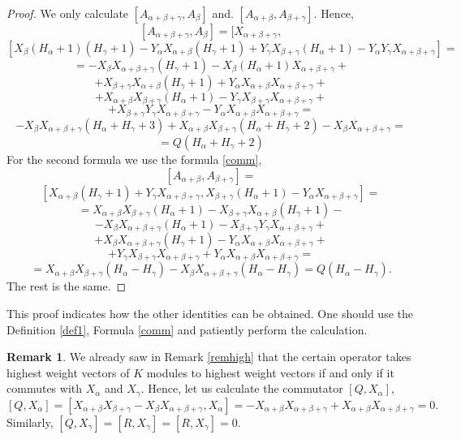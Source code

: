 \documentclass[twoside,a4paper,12pt]{article}
\theoremstyle{definition}
\newtheorem{remark}{Remark}
\begin{document}
\begin{proof}
	We only calculate $[A_{\alpha+\beta+\gamma},A_\beta]$ and.
	$[A_{\alpha+\beta},A_{\beta+\gamma}]$. Hence,
	\[ [A_{\alpha+\beta+\gamma},A_\beta]=[X_{\alpha+\beta+\gamma}, \]
	\[ [X_{\beta}(H_\alpha+1)(H_\gamma+1)-Y_\alpha X_{\alpha+\beta}(H_\gamma+1)
		+Y_\gamma X_{\beta+\gamma}(H_\alpha+1)
		-Y_\alpha Y_\gamma X_{\alpha+\beta+\gamma}]= \]
	\[ =-X_{\beta}X_{\alpha+\beta+\gamma}(H_\gamma+1)
		-X_{\beta}(H_\alpha+1)X_{\alpha+\beta+\gamma}+ \]
	\[ +X_{\beta+\gamma}X_{\alpha+\beta}(H_\gamma+1)
		+Y_\alpha X_{\alpha+\beta}X_{\alpha+\beta+\gamma}+ \]
	\[ +X_{\alpha+\beta}X_{\beta+\gamma}(H_\alpha+1)
		-Y_\gamma X_{\beta+\gamma}X_{\alpha+\beta+\gamma}+ \]
	\[ +X_{\beta+\gamma}Y_\gamma X_{\alpha+\beta+\gamma}
		-Y_\alpha X_{\alpha+\beta}X_{\alpha+\beta+\gamma}= \]
	\[ -X_{\beta}X_{\alpha+\beta+\gamma}(H_\alpha+H_\gamma+3)
		+X_{\alpha+\beta}X_{\beta+\gamma}(H_\alpha+H_\gamma+2)
		-X_{\beta}X_{\alpha+\beta+\gamma}= \]
	\[ =Q(H_\alpha+H_\gamma+2) \]
	For the second formula we use the formula \eqref{comm},
	\[ [A_{\alpha+\beta},A_{\beta+\gamma}]= \]
	\[ [X_{\alpha+\beta}(H_\gamma+1)+Y_\gamma X_{\alpha+\beta+\gamma},
		X_{\beta+\gamma}(H_\alpha+1)-Y_\alpha X_{\alpha+\beta+\gamma}]= \]
	\[ =X_{\alpha+\beta}X_{\beta+\gamma}(H_\alpha+1)
		-X_{\beta+\gamma}X_{\alpha+\beta}(H_\gamma+1)- \]
	\[ -X_\beta X_{\alpha+\beta+\gamma}(H_\alpha+1)
		-X_{\beta+\gamma}Y_\gamma X_{\alpha+\beta+\gamma}+ \]
	\[ +X_\beta X_{\alpha+\beta+\gamma}(H_\gamma+1)
		-Y_\alpha X_{\alpha+\beta}X_{\alpha+\beta+\gamma}+ \]
	\[ +Y_\gamma X_{\beta+\gamma}X_{\alpha+\beta+\gamma}
		+Y_\alpha X_{\alpha+\beta}X_{\alpha+\beta+\gamma}= \]
	\[ =X_{\alpha+\beta}X_{\beta+\gamma}(H_\alpha-H_\gamma)
		-X_{\beta}X_{\alpha+\beta+\gamma}(H_\alpha-H_\gamma)=
		Q(H_\alpha-H_\gamma). \]
	The rest is the same.
\end{proof}

This proof indicates how the other identities can be obtained.
One should use the Definition \eqref{def1}, Formula \eqref{comm} and patiently
perform the calculation.

\begin{remark}
	We already saw in Remark \eqref{remhigh} that the certain operator takes
	highest weight vectors of $K$ modules to highest weight vectors if and only
	if it commutes with $X_\alpha$ and $X_\gamma$. Hence, let us calculate
	the commutator $[Q,X_\alpha]$,
	\[ [Q,X_\alpha]=[X_{\alpha+\beta}X_{\beta+\gamma}-
		X_\beta X_{\alpha+\beta+\gamma},X_\alpha]=
		-X_{\alpha+\beta}X_{\alpha+\beta+\gamma}
		+X_{\alpha+\beta}X_{\alpha+\beta+\gamma}=0. \]
	Similarly, $[Q,X_\gamma]=[R,X_\gamma]=[R,X_\gamma]=0$.
\end{remark}
\end{document}
